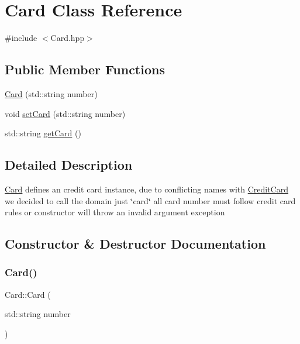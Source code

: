 \hypertarget{class_card}{}\section{Card Class Reference}
\label{class_card}


{\ttfamily \#include $<$Card.\+hpp$>$}

\subsection*{Public Member Functions}
\begin{DoxyCompactItemize}
\item 
\mbox{\hyperlink{class_card_aa9dabf52b287b823d9174ba859b4c858}{Card}} (std\+::string number)
\item 
void \mbox{\hyperlink{class_card_a97571980a043fd28f4a3fc8211d1cae8}{set\+Card}} (std\+::string number)
\item 
std\+::string \mbox{\hyperlink{class_card_ab7919dfd991323fbb9a6750ca03a4787}{get\+Card}} ()
\end{DoxyCompactItemize}


\subsection{Detailed Description}
\mbox{\hyperlink{class_card}{Card}} defines an credit card instance, due to conflicting names with \mbox{\hyperlink{class_credit_card}{Credit\+Card}} we decided to call the domain just \char`\"{}card\char`\"{} all card number must follow credit card rules or constructor will throw an invalid argument exception 

\subsection{Constructor \& Destructor Documentation}
\mbox{\label{class_card_aa9dabf52b287b823d9174ba859b4c858}} 
\subsubsection{\texorpdfstring{Card()}{Card()}}
{\footnotesize\ttfamily Card\+::\+Card (\begin{DoxyParamCaption}\item[{std\+::string}]{number }\end{DoxyParamCaption})}



